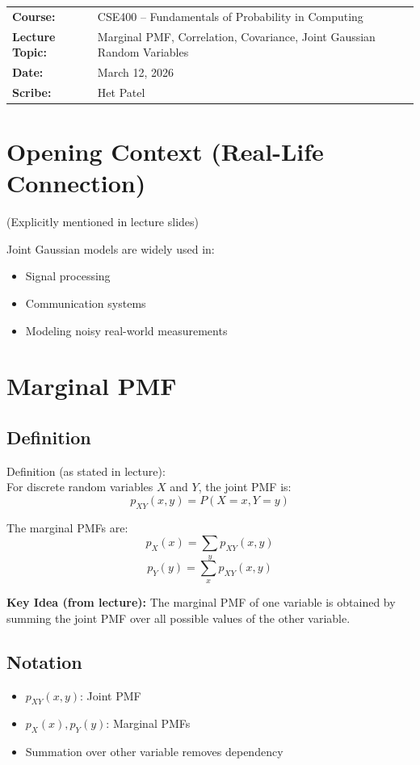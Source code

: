 \documentclass[11pt]{article}
\begin{document}
\begin{flushleft}
\renewcommand{\arraystretch}{1.2}
\begin{tabular}{@{}ll}
\textbf{Course:} & CSE400 – Fundamentals of Probability in Computing \\
\textbf{Lecture Topic:} & Marginal PMF, Correlation, Covariance, Joint Gaussian Random Variables \\
\textbf{Date:} & March 12, 2026 \\
\textbf{Scribe:} & Het Patel \\
\end{tabular}
\end{flushleft}

\vspace{0.3cm}

\section{Opening Context (Real-Life Connection)}
(Explicitly mentioned in lecture slides)

Joint Gaussian models are widely used in:
\begin{itemize}
    \item Signal processing
    \item Communication systems
    \item Modeling noisy real-world measurements
\end{itemize}

\section{Marginal PMF}
\subsection{Definition}
Definition (as stated in lecture):\\
For discrete random variables $X$ and $Y$, the joint PMF is:
\[ p_{XY}(x,y) = P(X = x, Y = y) \]

The marginal PMFs are:
\[ p_X(x) = \sum_{y} p_{XY}(x,y) \]
\[ p_Y(y) = \sum_{x} p_{XY}(x,y) \]

\textbf{Key Idea (from lecture):}
The marginal PMF of one variable is obtained by summing the joint PMF over all possible values of the other variable.

\subsection{Notation}
\begin{itemize}
    \item $p_{XY}(x,y)$: Joint PMF
    \item $p_X(x), p_Y(y)$: Marginal PMFs
    \item Summation over other variable removes dependency
\end{itemize}
\end{document}
